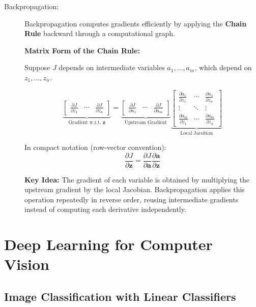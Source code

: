 \documentclass[12pt,a4paper]{report}
\begin{document}
\begin{description}
    \item[Backpropagation:]
    Backpropagation computes gradients efficiently by
    applying the \textbf{Chain Rule} backward through
    a computational graph.

    \textbf{Matrix Form of the Chain Rule:}

    Suppose $J$ depends on intermediate variables
    $a_1,\ldots,a_m$, which depend on $z_1,\ldots,z_n$.

    \[
    \underbrace{
    \begin{bmatrix}
        \frac{\partial J}{\partial z_1} &
        \cdots &
        \frac{\partial J}{\partial z_n}
    \end{bmatrix}
    }_{\text{Gradient w.r.t. } \mathbf z}
    =
    \underbrace{
    \begin{bmatrix}
        \frac{\partial J}{\partial a_1} &
        \cdots &
        \frac{\partial J}{\partial a_m}
    \end{bmatrix}
    }_{\text{Upstream Gradient}}
    \underbrace{
    \begin{bmatrix}
        \frac{\partial a_1}{\partial z_1} & \cdots &
        \frac{\partial a_1}{\partial z_n}\\
        \vdots & \ddots & \vdots\\
        \frac{\partial a_m}{\partial z_1} & \cdots &
        \frac{\partial a_m}{\partial z_n}
    \end{bmatrix}
    }_{\text{Local Jacobian}}
    \]

    In compact notation (row-vector convention):
    \[
        \boxed{
        \frac{\partial J}{\partial \mathbf z}
        =
        \frac{\partial J}{\partial \mathbf a}
        \frac{\partial \mathbf a}{\partial \mathbf z}
        }
    \]

    \textbf{Key Idea:}
    The gradient of each variable is obtained by
    multiplying the upstream gradient by the local
    Jacobian. Backpropagation applies this operation
    repeatedly in reverse order, reusing intermediate
    gradients instead of computing each derivative
    independently.
\end{description}

\chapter{Deep Learning for Computer Vision}


\section{Image Classification with Linear Classifiers}
\end{document}
